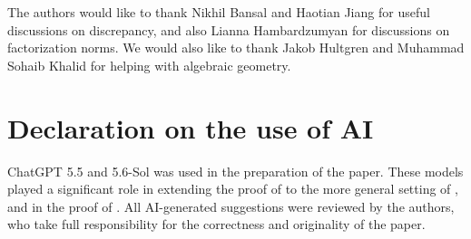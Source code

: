 \documentclass[11pt]{article}
\theoremstyle{plain}
\theoremstyle{definition}
\begin{document}
    The authors would like to thank Nikhil Bansal and Haotian Jiang for useful discussions on discrepancy, and also Lianna Hambardzumyan for discussions on factorization norms. We would also like to thank Jakob Hultgren and Muhammad Sohaib Khalid for helping with algebraic geometry.

    \section*{Declaration on the use of AI}

    ChatGPT 5.5 and 5.6-Sol was used in the preparation of the paper. These models played a significant role in extending the proof of  to the more general setting of , and in the proof of . All AI-generated suggestions were reviewed by the authors, who take full responsibility for the correctness and originality of the paper.
	
\end{document}
